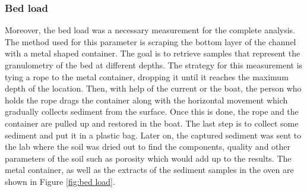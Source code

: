
\subsubsection{Bed load}
Moreover, the bed load was a necessary measurement for the complete analysis. The method used for this parameter is scraping the bottom layer of the channel with a metal shaped container. The goal is to retrieve samples that represent the granulometry of the bed at different depths. 
The strategy for this measurement is tying a rope to the metal container, dropping it until it reaches the maximum depth of the location. Then, with help of the current or the boat, the person who holds the rope drags the container along with the horizontal movement which gradually collects sediment from the surface. Once this is done, the rope and the container are pulled up and restored in the boat. The last step is to collect some sediment and put it in a plastic bag.  Later on, the captured sediment was sent to the lab where the soil was dried out to find the components, quality and other parameters of the soil such as porosity which would add up to the results. The metal container, as well as the extracts of the sediment samples in the oven are shown in Figure \ref{fig:bed load}. 

